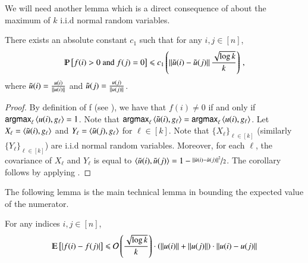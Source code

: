 \documentclass[11pt]{article}
\begin{document}
We will need another lemma which is a direct consequence of 
 about the maximum of $k$ i.i.d normal random
variables.  
\begin{corollary}
\label{cor:2gauss}
There exists an absolute constant $c_1$ such that for any $i,j \in [n]$,
\[   \Pr{ f(i) > 0 \textrm{ and }  f(j) = 0 } \leq c_1 \left( \norm{
	\tilde{u}(i) - \tilde{u}(j) } \frac{\sqrt{\log k}}{k}  \right)
	\mcom\]
where $\tilde{u}(i) = \frac{u(i)}{\left\lVert u(i)\right\rVert}$ and $\tilde{u}(j) =
\frac{u(j)}{\left\lVert u(j)\right\rVert}$.
\end{corollary}
\begin{proof}
	By definition of f (see ), we have that $f(i)
	\neq 0$ if and only if ${\sf argmax}_{\ell} \left\langle u(i), g_\ell\right\rangle =
	1$.  Note that ${\sf argmax}_\ell \left\langle \tilde{u}(i),g_\ell\right\rangle =
	{\sf argmax}_\ell \left\langle  u(i), g_\ell\right\rangle$.  
	Let $X_{\ell} = \left\langle  \tilde{u}(i), g_\ell\right\rangle$ and $Y_\ell =
	\left\langle  \tilde{u}(j), g_\ell\right\rangle$ for $\ell \in [k]$.  Note that
	$\{ X_\ell \}_{\ell \in [k]}$ (similarly $\{ Y_\ell \}_{\ell \in
	[k]}$) are i.i.d normal random variables.  Moreover, for each
	$\ell$, the covariance of $X_\ell $ and $Y_\ell$ is equal to
	$\left\langle \tilde{u}(i), \tilde{u}(j)\right\rangle = 1 - \nicefrac{\left\lVert\tilde{u}(i)
	- \tilde{u}(j)\right\rVert^2}{2}$.  The corollary follows by applying
	. 
\end{proof}


The following lemma is the main technical lemma in bounding the expected value of the numerator. 
\begin{lemma}
\label{lem:num-helper}
For any indices $i,j \in [n]$,
\[  \Ex{ \Abs{f(i) - f(j) } } 
\leq \cO\left(\frac{ \sqrt{\log k}}{k} \right) \cdot \left(
	\norm{u(i)} + \norm{u(j)} \right) \cdot  \norm{u(i) - u(j)} \]
\end{lemma}
\end{document}

